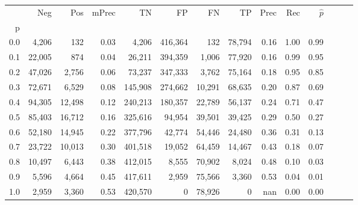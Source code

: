 \begin{tabular}{rrrrrrrrrrrrrr}
\toprule
{} &     Neg &     Pos & mPrec &       TN &       FP &      FN &      TP &  Prec &   Rec & $\hat{p}$ \\
p   &         &         &       &          &          &         &         &       &       &           \\
\midrule
0.0 &   4,206 &     132 &  0.03 &    4,206 &  416,364 &     132 &  78,794 &  0.16 &  1.00 &      0.99 \\
0.1 &  22,005 &     874 &  0.04 &   26,211 &  394,359 &   1,006 &  77,920 &  0.16 &  0.99 &      0.95 \\
0.2 &  47,026 &   2,756 &  0.06 &   73,237 &  347,333 &   3,762 &  75,164 &  0.18 &  0.95 &      0.85 \\
0.3 &  72,671 &   6,529 &  0.08 &  145,908 &  274,662 &  10,291 &  68,635 &  0.20 &  0.87 &      0.69 \\
0.4 &  94,305 &  12,498 &  0.12 &  240,213 &  180,357 &  22,789 &  56,137 &  0.24 &  0.71 &      0.47 \\
0.5 &  85,403 &  16,712 &  0.16 &  325,616 &   94,954 &  39,501 &  39,425 &  0.29 &  0.50 &      0.27 \\
0.6 &  52,180 &  14,945 &  0.22 &  377,796 &   42,774 &  54,446 &  24,480 &  0.36 &  0.31 &      0.13 \\
0.7 &  23,722 &  10,013 &  0.30 &  401,518 &   19,052 &  64,459 &  14,467 &  0.43 &  0.18 &      0.07 \\
0.8 &  10,497 &   6,443 &  0.38 &  412,015 &    8,555 &  70,902 &   8,024 &  0.48 &  0.10 &      0.03 \\
0.9 &   5,596 &   4,664 &  0.45 &  417,611 &    2,959 &  75,566 &   3,360 &  0.53 &  0.04 &      0.01 \\
1.0 &   2,959 &   3,360 &  0.53 &  420,570 &        0 &  78,926 &       0 &   nan &  0.00 &      0.00 \\
\bottomrule
\end{tabular}
